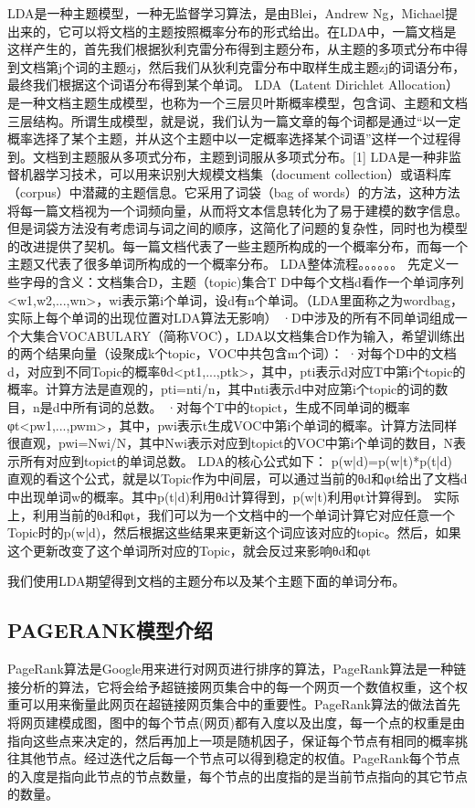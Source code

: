 \documentclass[master]{njuthesis}
\begin{document}
LDA是一种主题模型，一种无监督学习算法，是由Blei，Andrew Ng，Michael提出来的，它可以将文档的主题按照概率分布的形式给出。在LDA中，一篇文档是这样产生的，首先我们根据狄利克雷分布得到主题分布，从主题的多项式分布中得到文档第j个词的主题zj，然后我们从狄利克雷分布中取样生成主题zj的词语分布，最终我们根据这个词语分布得到某个单词。
LDA（Latent Dirichlet Allocation）是一种文档主题生成模型，也称为一个三层贝叶斯概率模型，包含词、主题和文档三层结构。所谓生成模型，就是说，我们认为一篇文章的每个词都是通过“以一定概率选择了某个主题，并从这个主题中以一定概率选择某个词语”这样一个过程得到。文档到主题服从多项式分布，主题到词服从多项式分布。[1] 
LDA是一种非监督机器学习技术，可以用来识别大规模文档集（document collection）或语料库（corpus）中潜藏的主题信息。它采用了词袋（bag of words）的方法，这种方法将每一篇文档视为一个词频向量，从而将文本信息转化为了易于建模的数字信息。但是词袋方法没有考虑词与词之间的顺序，这简化了问题的复杂性，同时也为模型的改进提供了契机。每一篇文档代表了一些主题所构成的一个概率分布，而每一个主题又代表了很多单词所构成的一个概率分布。
LDA整体流程。。。。。。
先定义一些字母的含义：文档集合D，主题（topic)集合T
D中每个文档d看作一个单词序列<w1,w2,...,wn>，wi表示第i个单词，设d有n个单词。（LDA里面称之为wordbag，实际上每个单词的出现位置对LDA算法无影响）
·D中涉及的所有不同单词组成一个大集合VOCABULARY（简称VOC），LDA以文档集合D作为输入，希望训练出的两个结果向量（设聚成k个topic，VOC中共包含m个词）：
·对每个D中的文档d，对应到不同Topic的概率θd<pt1,...,ptk>，其中，pti表示d对应T中第i个topic的概率。计算方法是直观的，pti=nti/n，其中nti表示d中对应第i个topic的词的数目，n是d中所有词的总数。
·对每个T中的topict，生成不同单词的概率φt<pw1,...,pwm>，其中，pwi表示t生成VOC中第i个单词的概率。计算方法同样很直观，pwi=Nwi/N，其中Nwi表示对应到topict的VOC中第i个单词的数目，N表示所有对应到topict的单词总数。
LDA的核心公式如下：
p(w|d)=p(w|t)*p(t|d)
直观的看这个公式，就是以Topic作为中间层，可以通过当前的θd和φt给出了文档d中出现单词w的概率。其中p(t|d)利用θd计算得到，p(w|t)利用φt计算得到。
实际上，利用当前的θd和φt，我们可以为一个文档中的一个单词计算它对应任意一个Topic时的p(w|d)，然后根据这些结果来更新这个词应该对应的topic。然后，如果这个更新改变了这个单词所对应的Topic，就会反过来影响θd和φt

我们使用LDA期望得到文档的主题分布以及某个主题下面的单词分布。

\subsection{PAGERANK模型介绍}

    PageRank算法是Google用来进行对网页进行排序的算法，PageRank算法是一种链接分析的算法，它将会给予超链接网页集合中的每一个网页一个数值权重，这个权重可以用来衡量此网页在超链接网页集合中的重要性。PageRank算法的做法首先将网页建模成图，图中的每个节点(网页)都有入度以及出度，每一个点的权重是由指向这些点来决定的，然后再加上一项是随机因子，保证每个节点有相同的概率挑往其他节点。经过迭代之后每一个节点可以得到稳定的权值。PageRank每个节点的入度是指向此节点的节点数量，每个节点的出度指的是当前节点指向的其它节点的数量。
\end{document}
